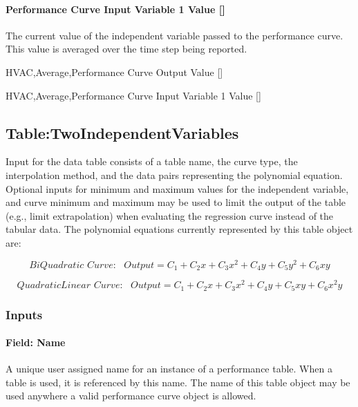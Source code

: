 \paragraph{\texorpdfstring{Performance Curve Input Variable 1 Value {[]}}{Performance Curve Input Variable 1 Value }}\label{performance-curve-input-variable-1-value}

The current value of the independent variable passed to the performance curve. This value is averaged over the time step being reported.

HVAC,Average,Performance Curve Output Value {[]}

HVAC,Average,Performance Curve Input Variable 1 Value {[]}

\subsection{Table:TwoIndependentVariables}\label{tabletwoindependentvariables}

Input for the data table consists of a table name, the curve type, the interpolation method, and the data pairs representing the polynomial equation. Optional inputs for minimum and maximum values for the independent variable, and curve minimum and maximum may be used to limit the output of the table (e.g., limit extrapolation) when evaluating the regression curve instead of the tabular data. The polynomial equations currently represented by this table object are:

\begin{equation}
BiQuadratic\,\,Curve:\,\,\,\,Output = {C_1} + {C_2}x + {C_3}{x^2} + {C_4}y + {C_5}{y^2} + {C_6}xy
\end{equation}

\begin{equation}
QuadraticLinear\,\,Curve:\,\,\,\,Output = {C_1} + {C_2}x + {C_3}{x^2} + {C_4}y + {C_5}xy + {C_6}{x^2}y
\end{equation}

\subsubsection{Inputs}\label{inputs-1-029}

\paragraph{Field: Name}\label{field-name-1-028}

A unique user assigned name for an instance of a performance table. When a table is used, it is referenced by this name. The name of this table object may be used anywhere a valid performance curve object is allowed.


